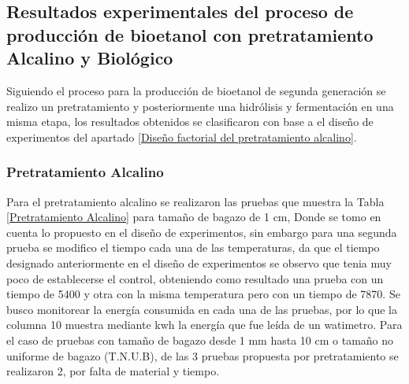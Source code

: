 \documentclass[12pt]{article}
\begin{document}
	     	
	     	
	     	
			
			
			\newpage

				\subsection{Resultados experimentales del proceso de producción de bioetanol con pretratamiento Alcalino  y Biológico}
				Siguiendo el proceso para la producción de bioetanol de segunda generación se realizo un pretratamiento y posteriormente una hidrólisis y fermentación en una misma etapa, los resultados obtenidos se clasificaron con base a el diseño de experimentos del apartado \ref{Diseño factorial del pretratamiento alcalino}.
				
				
				
				\subsubsection{Pretratamiento Alcalino}
				
				
	Para el pretratamiento alcalino se realizaron las pruebas que muestra la Tabla \ref{Pretratamiento Alcalino} para tamaño de bagazo de 1 cm, Donde se tomo en cuenta lo propuesto en el diseño de experimentos, sin embargo para una segunda prueba se modifico el tiempo cada una de las temperaturas, da que el tiempo designado anteriormente en el diseño de experimentos se observo que tenia muy poco de establecerse el control, obteniendo como resultado una prueba con un tiempo de 5400 y otra con la misma temperatura pero con un tiempo de 7870. 
	Se busco monitorear la energía consumida en cada una de las pruebas, por lo que la columna 10 muestra mediante kwh la energía que fue leída de un watimetro.
	Para el caso de pruebas con tamaño de bagazo desde 1 mm hasta 10 cm o tamaño no uniforme de bagazo (T.N.U.B), de las 3 pruebas propuesta por pretratamiento se realizaron 2, por falta de material y tiempo. 	
	
\end{document}
